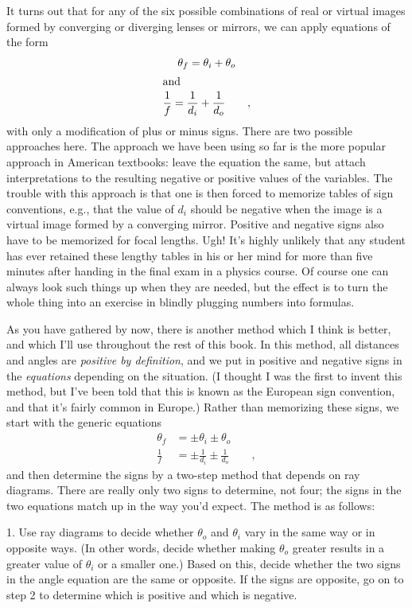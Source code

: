 It turns out that for any of the six possible combinations
of real or virtual images formed by converging or diverging
lenses or mirrors, we can apply equations of the form
\begin{gather*}
                \theta_f =  \theta_i+\theta_o \\
\intertext{and}
        \frac{1}{f}            =  \frac{1}{d_i}+\frac{1}{d_o}     \qquad   ,
\end{gather*}
with only a modification of plus or minus signs. There are
two possible approaches here. The approach we have been
using so far is the more popular approach in American
textbooks: leave the equation the same, but attach
interpretations to the resulting negative or positive values
of the variables. The trouble with this approach is that one
is then forced to memorize tables of sign conventions, e.g.,
that the value of $d_i$ should be negative when the image is
a virtual image formed by a converging mirror. Positive and
negative signs also have to be memorized for focal lengths.
Ugh! It's highly unlikely that any student has ever retained
these lengthy tables in his or her mind for more than five
minutes after handing in the final exam in a physics course.
Of course one can always look such things up when they are
needed, but the effect is to turn the whole thing into an
exercise in blindly plugging numbers into formulas.

As you have gathered by now, there is another method which I
think is better, and which I'll use throughout the rest of
this book. In this method, all distances and angles are
\emph{positive by definition}, and we put in positive and
negative signs in the \emph{equations} depending on the
situation. (I thought I was the first to invent this method,
but I've been told that this is known as the European sign
convention, and that it's fairly common in Europe.) Rather
than memorizing these signs, we start with the generic equations
\begin{align*}
                \theta_f &= \pm \theta_i \pm \theta_o \\
        \frac{1}{f}            &=  \pm\frac{1}{d_i}\pm\frac{1}{d_o}     \qquad   ,
\end{align*}
and then determine the signs by a two-step method that
depends on ray diagrams. There are really only two signs to
determine, not four; the signs in the two equations match up
in the way you'd expect. The method is as follows:

1. Use ray diagrams to decide whether $\theta_o$ and
$\theta_i$ vary in the same way or in opposite ways. (In
other words, decide whether making $\theta_o$ greater
results in a greater value of $\theta_i$ or a smaller one.)
Based on this, decide whether the two signs in the angle
equation are the same or opposite. If the signs are
opposite, go on to step 2 to determine which is positive
and which is negative.

